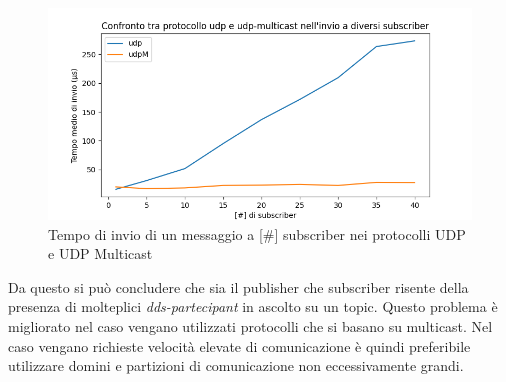 
\begin{figure}[H]
        \includegraphics[width=\textwidth]{./results/test3_udpvsudpM.png} 
        \caption{Tempo di invio di un messaggio a [\#] subscriber nei protocolli UDP e UDP Multicast}\label{fig:udpvsudpMfigure}
\end{figure}

Da questo si può concludere che sia il publisher che subscriber risente della presenza di molteplici \emph{dds-partecipant} in ascolto su un topic. Questo problema è migliorato nel caso vengano utilizzati protocolli che si basano su multicast. Nel caso vengano richieste velocità elevate di comunicazione è quindi preferibile utilizzare domini e partizioni di comunicazione non eccessivamente grandi.


